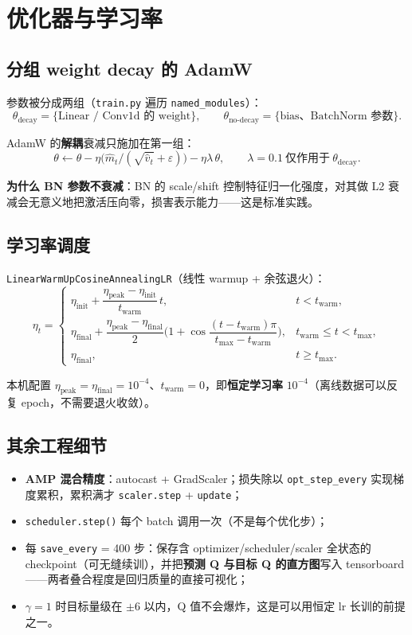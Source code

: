 \documentclass[11pt,a4paper]{ctexart}
\theoremstyle{remark}
\begin{document}
\section{优化器与学习率}\label{sec:optim}

\subsection{分组 weight decay 的 AdamW}

参数被分成两组（\texttt{train.py} 遍历 \texttt{named\_modules}）：
\[
\theta_{\text{decay}} = \{\text{Linear / Conv1d 的 weight}\},\qquad
\theta_{\text{no-decay}} = \{\text{bias、BatchNorm 参数}\}.
\]

AdamW 的\textbf{解耦}衰减只施加在第一组：
\[
\theta \leftarrow \theta - \eta\big(\hat{m}_t / (\sqrt{\hat{v}_t} + \varepsilon)\big) - \eta\lambda\,\theta,\qquad \lambda = 0.1\ \text{仅作用于}\ \theta_{\text{decay}}.
\]

\textbf{为什么 BN 参数不衰减}：BN 的 scale/shift 控制特征归一化强度，对其做 L2 衰减会无意义地把激活压向零，损害表示能力——这是标准实践。

\subsection{学习率调度}

\texttt{LinearWarmUpCosineAnnealingLR}（线性 warmup + 余弦退火）：
\[
\eta_t = \begin{cases}
\eta_{\text{init}} + \dfrac{\eta_{\text{peak}} - \eta_{\text{init}}}{t_{\text{warm}}}\, t, & t < t_{\text{warm}},\\[10pt]
\eta_{\text{final}} + \dfrac{\eta_{\text{peak}} - \eta_{\text{final}}}{2}\Big(1 + \cos\dfrac{(t - t_{\text{warm}})\pi}{t_{\max} - t_{\text{warm}}}\Big), & t_{\text{warm}} \le t < t_{\max},\\[10pt]
\eta_{\text{final}}, & t \ge t_{\max}.
\end{cases}
\]

本机配置 $\eta_{\text{peak}} = \eta_{\text{final}} = 10^{-4}$、$t_{\text{warm}} = 0$，即\textbf{恒定学习率} $10^{-4}$（离线数据可以反复 epoch，不需要退火收敛）。

\subsection{其余工程细节}

\begin{itemize}[leftmargin=2em]
  \item \textbf{AMP 混合精度}：autocast + GradScaler；损失除以 \texttt{opt\_step\_every} 实现梯度累积，累积满才 \texttt{scaler.step} + \texttt{update}；
  \item \texttt{scheduler.step()} 每个 batch 调用一次（不是每个优化步）；
  \item 每 \texttt{save\_every} = 400 步：保存含 optimizer/scheduler/scaler 全状态的 checkpoint（可无缝续训），并把\textbf{预测 Q 与目标 Q 的直方图}写入 tensorboard——两者叠合程度是回归质量的直接可视化；
  \item $\gamma = 1$ 时目标量级在 $\pm 6$ 以内，Q 值不会爆炸，这是可以用恒定 lr 长训的前提之一。
\end{itemize}
\end{document}
